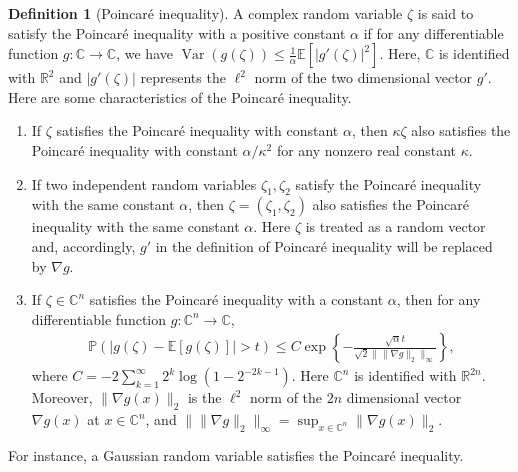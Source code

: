 \documentclass[12pt]{amsart}
\theoremstyle{plain}
\theoremstyle{definition}
\newtheorem{defn}[Thm]{Definition}
\newcommand{\Var}{\operatorname{Var}}
\begin{document}
  \begin{defn}[Poincaré inequality]{\label{def:Poincaré inequality}} A complex random variable $\zeta$ is said to satisfy the Poincar\'e inequality with a positive constant $\alpha$ if for any differentiable function $g:\mathbb{C}\to\mathbb{C}$, we have $\Var(g(\zeta))\leq \frac{1}{\alpha}\mathbb{E}[|g'(\zeta)|^{2}].$ Here, $\mathbb{C}$ is identified with $\mathbb{R}^{2}$ and $|g'(\zeta)|$ represents the $\ell^{2}$ norm of the two dimensional vector $g'$. Here are some characteristics of the Poincar\'e inequality.
  \begin{enumerate}
      \item If $\zeta$ satisfies the Poincar\'e inequality with constant $\alpha$, then $\kappa \zeta$ also satisfies the Poincar\'e inequality with constant $\alpha/\kappa^{2}$ for any nonzero real constant $\kappa.$
      \item If two independent random variables $\zeta_{1}, \zeta_{2}$ satisfy the Poincar\'e inequality with the same constant $\alpha$, then $\zeta=(\zeta_{1}, \zeta_{2})$ also satisfies the Poincar\'e inequality with the same constant $\alpha$. Here $\zeta$ is treated as a random vector and, accordingly, $g'$ in the definition of Poincar\'e inequality will be replaced by $\nabla g$.
      \item \cite[Lemma 4.4.3]{anderson2010introduction} If $\zeta\in \mathbb{C}^{n}$ satisfies the Poincar\'e inequality with a constant $\alpha$, then for any differentiable function $g:\mathbb{C}^{n}\to\mathbb{C}$,
      \begin{align*}
          \mathbb{P}(|g(\zeta) - \mathbb{E}[g(\zeta)]| > t)\leq C\exp\left\{-\frac{\sqrt{\alpha}t}{\sqrt{2}\|\|\nabla g\|_{2}\|_{\infty}}\right\},
      \end{align*}
      where $C=-2\sum_{k=1}^{\infty}2^{k}\log(1-2^{-2k-1}).$ Here $\mathbb{C}^{n}$ is identified with $\mathbb{R}^{2n}$. Moreover, $\|\nabla g(x)\|_{2}$ is the $\ell^{2}$ norm of the $2n$ dimensional vector $\nabla g(x)$ at $x\in \mathbb{C}^{n}$, and $\|\|\nabla g\|_{2}\|_{\infty}=\sup_{x\in \mathbb{C}^{n}}\|\nabla g(x)\|_{2}.$
    \end{enumerate}
\end{defn}  

For instance, a Gaussian random variable satisfies the Poincar\'e inequality.
\end{document}
